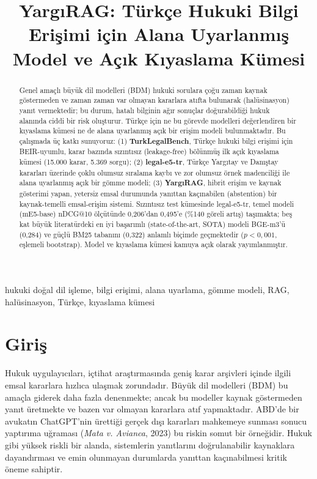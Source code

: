 \documentclass[conference]{IEEEtran}
\begin{document}
\title{YargıRAG: Türkçe Hukuki Bilgi Erişimi için Alana Uyarlanmış Model ve Açık Kıyaslama Kümesi}

\author{
}

\maketitle

\begin{abstract}
Genel amaçlı büyük dil modelleri (BDM) hukuki sorulara çoğu zaman kaynak göstermeden ve zaman zaman var olmayan kararlara atıfta bulunarak (halüsinasyon) yanıt vermektedir; bu durum, hatalı bilginin ağır sonuçlar doğurabildiği hukuk alanında ciddi bir risk oluşturur. Türkçe için ne bu görevde modelleri değerlendiren bir kıyaslama kümesi ne de alana uyarlanmış açık bir erişim modeli bulunmaktadır. Bu çalışmada üç katkı sunuyoruz: (1) \textbf{TurkLegalBench}, Türkçe hukuki bilgi erişimi için BEIR-uyumlu, karar bazında sızıntısız (leakage-free) bölünmüş ilk açık kıyaslama kümesi (15.000 karar, 5.369 sorgu); (2) \textbf{legal-e5-tr}, Türkçe Yargıtay ve Danıştay kararları üzerinde çoklu olumsuz sıralama kaybı ve zor olumsuz örnek madenciliği ile alana uyarlanmış açık bir gömme modeli; (3) \textbf{YargıRAG}, hibrit erişim ve kaynak gösterimi yapan, yetersiz emsal durumunda yanıttan kaçınabilen (abstention) bir kaynak-temelli emsal-erişim sistemi. Sızıntısız test kümesinde legal-e5-tr, temel modeli (mE5-base) nDCG@10 ölçütünde 0,206'dan 0,495'e (\%140 göreli artış) taşımakta; beş kat büyük literatürdeki en iyi başarımlı (state-of-the-art, SOTA) modeli BGE-m3'ü (0,284) ve güçlü BM25 tabanını (0,322) anlamlı biçimde geçmektedir ($p<0{,}001$, eşlemeli bootstrap). Model ve kıyaslama kümesi kamuya açık olarak yayımlanmıştır.
\end{abstract}

\begin{IEEEkeywords}
hukuki doğal dil işleme, bilgi erişimi, alana uyarlama, gömme modeli, RAG, halüsinasyon, Türkçe, kıyaslama kümesi
\end{IEEEkeywords}

\section{Giriş}
Hukuk uygulayıcıları, içtihat araştırmasında geniş karar arşivleri içinde ilgili emsal kararlara hızlıca ulaşmak zorundadır. Büyük dil modelleri (BDM) bu amaçla giderek daha fazla denenmekte; ancak bu modeller kaynak göstermeden yanıt üretmekte ve bazen var olmayan kararlara atıf yapmaktadır. ABD'de bir avukatın ChatGPT'nin ürettiği gerçek dışı kararları mahkemeye sunması sonucu yaptırıma uğraması (\textit{Mata v. Avianca}, 2023) bu riskin somut bir örneğidir. Hukuk gibi yüksek riskli bir alanda, sistemlerin yanıtlarını doğrulanabilir kaynaklara dayandırması ve emin olunmayan durumlarda yanıttan kaçınabilmesi kritik öneme sahiptir.
\end{document}

